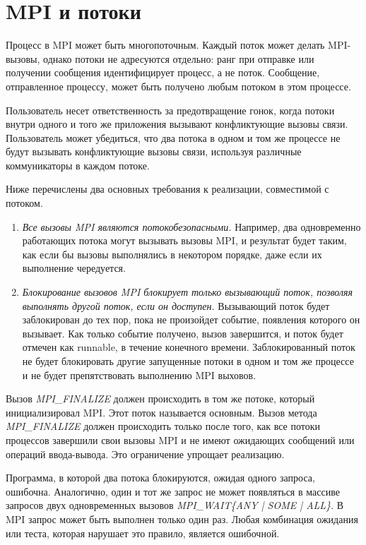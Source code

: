 \chapter{MPI и потоки}
	
	Процесс в MPI может быть многопоточным. 
	Каждый поток может делать MPI-вызовы, однако потоки не адресуются отдельно: ранг при отправке или получении сообщения идентифицирует процесс, а не поток. 
	Сообщение, отправленное процессу, может быть получено любым потоком в этом процессе.
	 
	Пользователь несет ответственность за предотвращение гонок, когда потоки внутри одного и того же приложения вызывают конфликтующие вызовы связи. 
	Пользователь может убедиться, что два потока в одном и том же процессе не будут вызывать конфликтующие вызовы связи, используя различные коммуникаторы в каждом потоке.
	
	Ниже перечислены два основных требования к реализации, совместимой с потоком. 
	\begin{enumerate}
		\item \textit{Все вызовы MPI являются потокобезопасными.} 
		Например, два одновременно работающих потока могут вызывать вызовы MPI, и результат будет таким, как если бы вызовы выполнялись в некотором порядке, даже если их выполнение чередуется.
		\item \textit{Блокирование вызовов MPI блокирует только вызывающий поток, позволяя выполнять другой поток, если он доступен.} 
		Вызывающий поток будет заблокирован до тех пор, пока не произойдет событие, появления которого он вызывает. 
		Как только событие получено, вызов завершится, и поток будет отмечен как runnable, в течение конечного времени. Заблокированный поток не будет блокировать другие запущенные потоки в одном и том же процессе и не будет препятствовать выполнению MPI выховов.
	\end{enumerate}

	Вызов \textit{MPI\_FINALIZE} должен происходить в том же потоке, который инициализировал MPI. 
	Этот поток называется основным. 
	Вызов метода \textit{MPI\_FINALIZE} должен происходить только после того, как все потоки процессов завершили свои вызовы MPI и не имеют ожидающих сообщений или операций ввода-вывода. 
	Это ограничение упрощает реализацию.
	
	Программа, в которой два потока блокируются, ожидая одного запроса, ошибочна. 
	Аналогично, один и тот же запрос не может появляться в массиве запросов двух одновременных вызовов \textit{MPI\_WAIT\{ANY | SOME | ALL\}}. 
	В MPI запрос может быть выполнен только один раз. 
	Любая комбинация ожидания или теста, которая нарушает это правило, является ошибочной.
	

